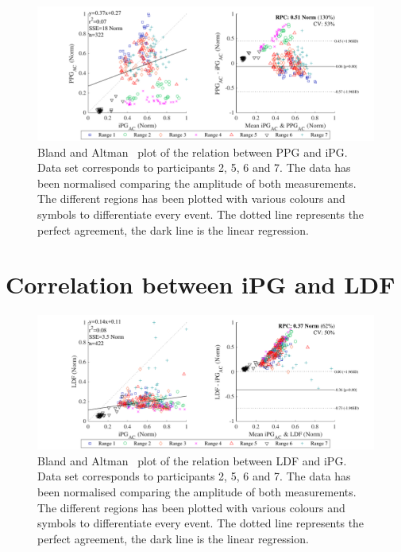 \begin{figure}[!htpb]
	\includegraphics[width=1\textwidth,keepaspectratio]{figure3}    
	\caption[Bland and Altman plot of the relation between PPG and iPG]{Bland and Altman~\cite{bland1986statistical} plot of the relation between PPG and iPG. Data set corresponds to participants 2, 5, 6 and 7. The data has been normalised comparing the amplitude of both measurements. The different regions has been plotted with various colours and symbols to differentiate every event. The dotted line represents the perfect agreement, the dark line is the linear regression.}
	\label{fig:corr RED}
\end{figure}

\section{Correlation between iPG and LDF}  %
\label{section correlation 4}

\begin{figure}[!htpb]
	\includegraphics[width=1\textwidth,keepaspectratio]{figure4}    
	\caption[Bland and Altman plot of the relation between LDF and iPG]{Bland and Altman~\cite{bland1986statistical} plot of the relation between LDF and iPG. Data set corresponds to participants 2, 5, 6 and 7. The data has been normalised comparing the amplitude of both measurements. The different regions has been plotted with various colours and symbols to differentiate every event. The dotted line represents the perfect agreement, the dark line is the linear regression.}
	\label{fig:corr LDF}
\end{figure}

